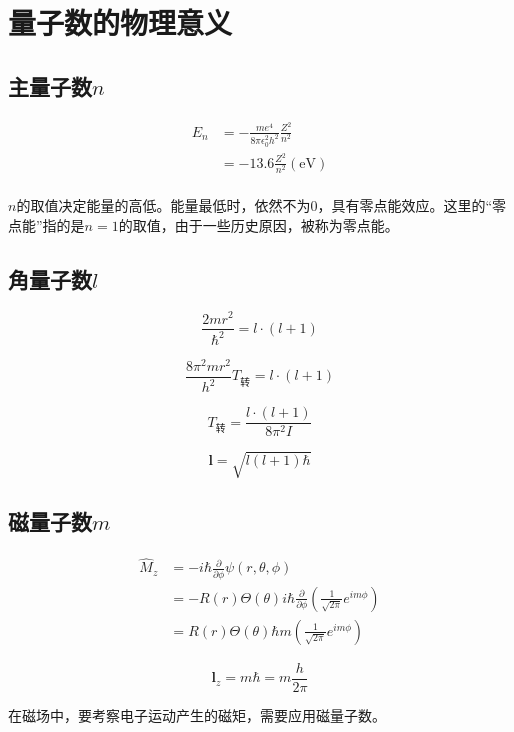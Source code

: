 
\section{量子数的物理意义}

\subsection{主量子数$n$}

\begin{align*}
    E_n &= - \frac{me^4}{8 \pi \epsilon_0^2 h^2} \frac{Z^2}{n^2} \\ 
    &= - 13.6 \frac{Z^2}{n^2} (\mathrm{eV})\\
\end{align*}

$n$的取值决定能量的高低。能量最低时，依然不为0，具有零点能效应。这里的``零点能''指的是$n = 1$的取值，由于一些历史原因，被称为零点能。

\subsection{角量子数$l$}

\begin{equation*}
    \frac{2m r^2}{\hbar ^2} = l \cdot (l + 1)
\end{equation*}

\begin{equation*}
    \frac{8 \pi^2 m r ^2}{h^2} T_{\mbox{转}} = l \cdot (l + 1)
\end{equation*}

\begin{equation*}
    T_{\mbox{转}} = \frac{l \cdot (l + 1)}{8 \pi^2 I}
\end{equation*}

\begin{equation*}
    \mathbf{l} = \sqrt{l(l + 1)\hbar}
\end{equation*}


\subsection{磁量子数$m$}

\begin{align*}
    \hat{M}_z &= -i\hbar \frac{\partial}{\partial \phi} \psi(r, \theta, \phi) \\ 
    &= - R(r) \Theta(\theta) i \hbar \frac{\partial}{\partial \phi} \left( \frac{1}{\sqrt{2\pi}} e^{im\phi} \right) \\
    &= R(r) \Theta(\theta) \hbar m \left( \frac{1}{\sqrt{2\pi}} e^{im\phi} \right)
\end{align*}

\begin{equation*}
    \mathbf{l}_z = m\hbar = m\frac{h}{2\pi}
\end{equation*}

在磁场中，要考察电子运动产生的磁矩，需要应用磁量子数。

